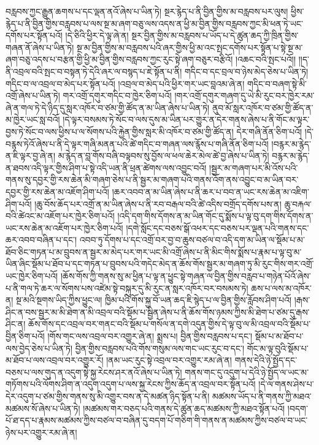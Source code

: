 བརླབས་ཀྱང་རྒྱུན་ཆགས་པ་དང་ལྡན་ནའོ་ཞེས་པ་ཡིན་ཏེ། སྔར་རྙེད་པ་ནི་བྱིན་གྱིས་མ་བརླབས་པར་ལུས། ཕྱིས་རྙེད་པ་ནི་བྱིན་གྱིས་བརླབས་པ་ལས་སྔ་མ་ཞག་བཅུ་ལས་འདས་ན་ཕྱི་མ་བྱིན་གྱིས་བརླབས་ཀྱང་མི་ཕན་ཏེ་ཡང་དགོས་པར་སྟོན་པའོ། །དེ་ཅིའི་ཕྱིར་དེ་ལྟ་ཞེ་ན། སྔར་བྱིན་གྱིས་མ་བརླབས་པ་ཡོད་པ་དེ་ཚུན་ཆད་ཀྱི་ཁྲིན་གྱིས་གཞན་ནོ་ཞེས་པ་ཡིན་ཏེ། སྔ་མ་བྱིན་གྱིས་མ་བརླབས་པའི་ཞར་གྱིས་ཕྱི་མ་འང་སྤང་དགོས་པར་སྟོན་པ་སྟེ་སྔ་མ་ཞག་བཅུ་འདས་པ་བརྩན་གྱི་ཕྱི་མ་བྱིན་གྱིས་བརླབས་ཀྱང་རུང་སྟེ་ཞག་བཅུར་བརྩིའོ། །འཆང་བའི་སྤང་པའོ།། །།ད་ནི་འབྲལ་བའི་སྤང་བ་བསྟན་ཏེ་དེའི་ཞར་ལ་བསྙད་པ་ཇེ་སྟོན་པ་ནི། གདིང་བ་དང་བྲལ་བ་ཉེས་མེད་ཅེས་པ་ཡིན་ཏེ། གདིང་བ་ལ་འབྲལ་བ་མེད་པར་སྟོན་པའོ། །འབྲལ་བ་མེད་པའི་ཕྱིར་གར་ཡང་བླའམ་ཞེ་ན། གདིང་བ་བཞག་སྟེ་མི་འགྲོ་ཞེས་པ་ཡིན་ཏེ། གར་འགྲོ་དགུར་གདིང་བ་ཁྱེར་ཅིག་པའོ། །གར་འགྲོ་དགུར་གཞག་དུ་ཡེ་མི་རུང་བར་ཁྱེར་རམ་ཞེ་ན་གལ་ཏེ་དེ་ཉིད་དུ་སླར་འཁོར་བ་ཙམ་གྱི་ཚོད་ན་མ་ཡིན་ཞེས་པ་ཡིན་ཏེ། ནུབ་མོ་སླར་འཁོར་བ་ཙམ་གྱི་ཚོད་ན་མ་ཁྱེར་ཡང་སླ་བའོ། །དེ་ལྟར་བསམས་ཏེ་སོང་བ་ལས་དུས་མ་ཡིན་པར་གྱུར་ན་དེར་གནས་ཞེས་པ་ནི་གོང་མ་ལྟར་བྱས་ཏེ་སོང་བ་ལས་ཕྱིས་པ་ལ་སོགས་པའི་རྐྱེན་གྱིས་སླར་མི་འཁོར་བ་ཙམ་གྱི་ཚོད་ན། དེར་གཞི་ནོན་ཅིག་པའོ། །དེ་བརྙས་ཏེའོ་ཞེས་པ་ནི་དེ་ལྟར་གཞི་མནན་པའི་ཚེ་གདིང་བ་གཞན་ལས་རྙོས་པ་གཞི་ནོན་ཅིག་པའོ། །བརྙར་མ་རྙེད་ན་ཇི་ལྟར་བྱ་ཞེ་ན། མ་རྙེད་ན་བླ་གོས་བཞི་བལྟབས་སུ་བྱོས་ལ་ཕལ་ཆེར་མེལ་ཚེ་བྱ་ཞེས་པ་ཡིན་ཏེ། བརྙར་མ་རྙེད་ན་ཐབས་འདི་ལྟར་གྱིས་ཤིག་པ་སྟེ་འདི་ཡན་ནི་ཕྲན་ཚེགས་ལས་འབྱུང་བའོ། །སྦྱར་མ་གཞག་པར་མི་འོས་པའི་གནས་སུ་དབྱར་གྱི་རས་ཆེན་མི་གཞག་ཅེས་པ་ནི་སྦྱར་མ་གཞག་པའི་གནས་འོག་ནས་འབྱུང་བ་མ་ཡིན་བར་དབྱར་གྱི་རས་ཆེན་མ་འཇོག་ཤིག་པའོ། །ཆར་འབབ་ན་མ་ཡིན་ཞེས་པ་ནི་ཆར་པ་བབ་ན་ཡང་རས་ཆེན་མ་འཇིག་ཤིག་པའོ། །ཆུ་བོས་ཆོད་པར་འགྲོ་ན་མ་ཡིན་ཞེས་པ་ནི་རབ་བརྒལ་བའི་ཚེ་འདིས་བགྲོད་དགོས་པས་ན། ཆུ་བརྐལ་བའི་ཚེའང་མ་འཇོག་པར་ཁྱེར་ཅིག་པའོ། །འདི་དག་གིས་དོགས་ན་མ་ཡིན་གོང་དུ་སྨོས་པ་ལྟ་བུ་དག་གིས་དོགས་ན་ཡང་རས་ཆེན་མ་འཇོག་པར་ཁྱེར་ཅིག་པའོ། །དགེ་སློང་དང་བཅས་སྒོ་འཕར་དང་བཅས་པར་ལྡན་པའི་གནས་དང་ཆར་འབབ་བཞིན་པ་དང་། འབབ་ཏུ་དོགས་པ་དང་འགྲོ་བར་བྱ་བ་ཆུས་བཙལ་བ་འདི་དག་མ་ཡིན་ལ་སྡོམ་པ་མ་ཐོབ་ཅིང་གཏན་པ་མ་བྲུབས་ན་སྦྱར་མ་མེད་པར་གར་ཡང་མི་འགྲོ་ཞེས་པ་ནི་མིང་གིས་སྨོས་པ་རྣམ་པ་ལྟ་བུ་མ་ཡིན་ཞིང་སྡོམ་པ་ཐོབ་པ་དང་གཏན་པ་བྲུབས་པའི་གདེང་མེད་ན་ཆོས་གོས་སྦྱར་མ་གཞག་ཏུ་མི་རུང་གིས་གར་འགྲོ་ཡང་ཁྱེར་ཅིག་པའོ། །ཆོས་གོས་ཀྱི་གནས་སུ་མ་ཕྱིན་པ་ལྟ་ན་ཕྱུང་སྟེ་གཞན་ལ་བྱིན་གྱིས་བརླབ་པ་གཉེན་པོའོ་ཞེས་པ་ནི་གལ་ཏེ་ཆར་ལ་སོགས་པས་འཛེམ་སྟེ་བསྐུར་དུ་མི་རུང་ན་སླར་འཁོར་བར་བསམས་ཏེ། ཆས་པ་ལས་མ་འཁོར་ན། སྔ་མའི་སྔགས་ཡིད་ཀྱིས་ཕྱུང་ལ། ཁྱིམ་པའི་གོས་སྐྱ་བོ་ཡན་ཆད་ཇི་སྙེད་པ་ལ་བྱིན་གྱིས་རློབས་ཤིག་པའོ། །རྒས་ཤིང་ན་བས་སྦྱར་མ་མི་ཐེག་ན་མི་འབྲལ་བའི་སྡོམ་པ་སྦྱིན་ཞེས་པ་ནི་ཆོས་གོས་ཉམས་ཀྱིས་མི་ཐེག་པ་ཙམ་དུ་རྒས་ཤིང་ན། ཆོས་གོས་དང་འབྲལ་བར་གནང་བའི་སྡོམ་པ་གསོལ་ན་དགེ་འདུན་གྱིས་དེ་ལྟ་བུ་ལ་མི་འབྲལ་བའི་སྡོམ་པ་བྱིན་ཅིག་པའོ། །གོས་གང་ལས་འབྲལ་བར་འགྱུར་ཞེ་ན། སྨྲས་པ། བྱིན་གྱིས་བརླབས་པ་དང་། སྡོམ་པ་མ་ཐོབ་པ་ལས་བྱེད་ཅེས་པ་ཡིན་ཏེ། བྱིན་གྱིས་བརླབས་པའི་གོས་གསུམ་ལས་གང་ཡང་རུང་བ་དང་། གོང་མ་ལྟ་བུའི་སྡོམ་པ་མ་ཐོབ་པ་ལས་འབྲལ་བར་འགྱུར་རོ། །ནམ་ཡང་རུང་སྟེ་འབྲལ་བར་འགྱུར་རམ་ཞེ་ན། གནས་དེའི་ཉེ་སྤྱོད་དང་བཅས་པ་ལས་གུད་ན་འདུག་སྟེ་སྐྱ་རེངས་ཤར་ནའོ་ཞེས་པ་ཡིན་ཏེ། གནས་གང་དུ་འདུག་པ་དེའི་ཉེ་སྤྱོད་ལ་ཡང་མ་གཏོགས་པའི་ལོགས་ཤིག་ན་འདུག་འདུག་པ་ལས་སྐྱ་རེངས་ཀྱིས་ཆོད་ན་འབྲལ་བར་སྟོན་པའོ། །དེ་ལ་གནས་ཤེས་པ་དེར་འདུག་པ་ཙམ་གྱིས་གནས་སུ་མི་འགྱུར་བས་ན་དེ་མཚན་ཉིད་སྟོན་པ་ནི། མཚམས་ཡོད་པ་ནི་གནས་ཀྱི་མཐའ་མཚམས་སོ་ཞེས་པ་ཡིན་ཏེ། །མཚམས་གར་བཅད་པའི་གནས་དེ་ཚུན་ཆད་མཚམས་ཀྱི་མཐའ་སྟོན་པའོ། །བདག་པོ་ཐ་དད་པ་རྣམས་མཚམས་ཀྱིས་བཙལ་བ་བཞིན་དུ་བདག་པོ་གཅིག་གི་གནས་ན་མཚམས་ཀྱིས་བཙལ་བ་ཡང་ཉེས་པར་འགྱུར་རམ་ཞེ་ན། 